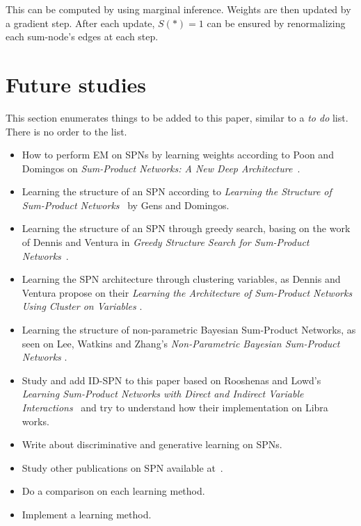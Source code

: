 \documentclass[a4paper,10pt]{article}
\theoremstyle{plain}
\begin{document}
This can be computed by using marginal inference. Weights are then updated by a gradient step.
After each update, $S(*)=1$ can be ensured by renormalizing each sum-node's edges at each step.

\section{Future studies}

This section enumerates things to be added to this paper, similar to a \textit{to do} list. There
is no order to the list.

\begin{itemize}
  \item How to perform EM on SPNs by learning weights according to Poon and Domingos on
    \textit{Sum-Product Networks: A New Deep Architecture}~\cite{poon-domingos}.
  \item Learning the structure of an SPN according to \textit{Learning the Structure of
    Sum-Product Networks}~\cite{gens-domingos} by Gens and Domingos.
  \item Learning the structure of an SPN through greedy search, basing on the work of Dennis and
    Ventura in \textit{Greedy Structure Search for Sum-Product Networks}~\cite{greedy-search}.
  \item Learning the SPN architecture through clustering variables, as Dennis and Ventura propose
    on their \textit{Learning the Architecture of Sum-Product Networks Using Cluster on Variables}
    \cite{clustering}.
  \item Learning the structure of non-parametric Bayesian Sum-Product Networks, as seen on Lee,
    Watkins and Zhang's \textit{Non-Parametric Bayesian Sum-Product Networks}
    \cite{non-parametric-bayesian}.
  \item Study and add ID-SPN to this paper based on Rooshenas and Lowd's \textit{Learning
    Sum-Product Networks with Direct and Indirect Variable Interactions}~\cite{id-spn} and try to
    understand how their implementation on Libra~\cite{libra} works.
  \item Write about discriminative and generative learning on SPNs.
  \item Study other publications on SPN available at~\cite{website:spn-uwashington}.
  \item Do a comparison on each learning method.
  \item Implement a learning method.
\end{itemize}

\newpage

\printbibliography[heading=bibintoc]
\end{document}

